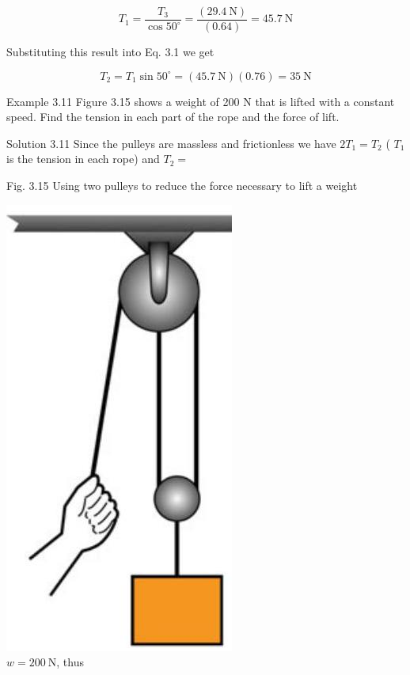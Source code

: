 \documentclass[10pt]{article}
\begin{document}
$$
T_{1}=\frac{T_{3}}{\cos 50^{\circ}}=\frac{(29.4 \mathrm{~N})}{(0.64)}=45.7 \mathrm{~N}
$$

Substituting this result into Eq. 3.1 we get

$$
T_{2}=T_{1} \sin 50^{\circ}=(45.7 \mathrm{~N})(0.76)=35 \mathrm{~N}
$$

Example 3.11 Figure 3.15 shows a weight of 200 N that is lifted with a constant speed. Find the tension in each part of the rope and the force of lift.

Solution 3.11 Since the pulleys are massless and frictionless we have $2 T_{1}=T_{2}$ ( $T_{1}$ is the tension in each rope) and $T_{2}=$

Fig. 3.15 Using two pulleys to reduce the force necessary to lift a weight

\includegraphics[max width=\textwidth, center]{2024_09_13_db1f357d2aad0a03eb2eg-057(1)}\\
$w=200 \mathrm{~N}$, thus
\end{document}
